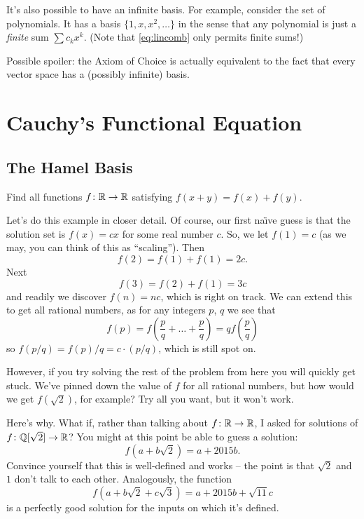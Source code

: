 \documentclass[11pt]{scrartcl}
\begin{document}
It's also possible to have an infinite basis.
For example, consider the set of polynomials.
It has a basis $\{1, x, x^2, \dots\}$ in the sense that any polynomial
is just a \emph{finite} sum $\sum c_k x^k$.
(Note that \eqref{eq:lincomb} only permits finite sums!)

\begin{remark}
  Possible spoiler:
  the Axiom of Choice is actually equivalent to the fact
  that every vector space has a (possibly infinite) basis.
\end{remark}


\section{Cauchy's Functional Equation}
\subsection{The Hamel Basis}
\begin{example}
  Find all functions $f \colon \mathbb R \to \mathbb R$ satisfying $f(x+y) = f(x)+f(y)$.
\end{example}
Let's do this example in closer detail.
Of course, our first na\"{\i}ve guess is that the solution set
is $f(x) = cx$ for some real number $c$.
So, we let $f(1) = c$ (as we may, you can think of this as ``scaling'').
Then
\[ f(2) = f(1) + f(1) = 2c. \]
Next
\[ f(3) = f(2) + f(1) = 3c \]
and readily we discover $f(n) = nc$, which is right on track.
We can extend this to get all rational numbers, as for any integers $p$, $q$ we see that
\[
  f\left( p \right)
  = f\left( \frac pq + \dots + \frac pq \right)
  = q f\left( \frac pq \right) \]
so $f(p/q) = f(p) / q = c \cdot (p/q)$, which is still spot on.

However, if you try solving the rest of the problem from here you will quickly get stuck.
We've pinned down the value of $f$ for all rational numbers,
but how would we get $f(\sqrt 2)$, for example?
Try all you want, but it won't work.

Here's why.
What if, rather than talking about $f \colon \mathbb R \to \mathbb R$,
I asked for solutions of $f \colon \mathbb Q[\sqrt 2] \to \mathbb R$?
You might at this point be able to guess a solution:
\[
  f\left( a + b \sqrt 2 \right)
  = a + 2015b.
\]
Convince yourself that this is well-defined and works --
the point is that $\sqrt 2$ and $1$ don't talk to each other.
Analogously, the function
\[
  f\left( a + b \sqrt 2 + c \sqrt 3 \right)
  = a + 2015b + \sqrt{11} c
\]
is a perfectly good solution for the inputs on which it's defined.
\end{document}
